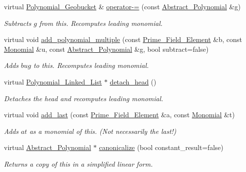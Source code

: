 \begin{Indent}
\begin{DoxyCompactItemize}
\mbox{\label{class_polynomial___geobucket_a7ac0e51256f70a5fba1ea4752d44f0cb}} 
virtual \hyperlink{class_polynomial___geobucket}{Polynomial\+\_\+\+Geobucket} \& \hyperlink{class_polynomial___geobucket_a7ac0e51256f70a5fba1ea4752d44f0cb}{operator-\/=} (const \hyperlink{class_abstract___polynomial}{Abstract\+\_\+\+Polynomial} \&g)
\begin{DoxyCompactList}\small\item\em Subtracts $g$ from {\ttfamily this}. Recomputes leading monomial. \end{DoxyCompactList}\item 
\mbox{\label{class_polynomial___geobucket_a38c043a681aa0c9f1d7deda14513616b}} 
virtual void \hyperlink{class_polynomial___geobucket_a38c043a681aa0c9f1d7deda14513616b}{add\+\_\+polynomial\+\_\+multiple} (const \hyperlink{class_prime___field___element}{Prime\+\_\+\+Field\+\_\+\+Element} \&b, const \hyperlink{class_monomial}{Monomial} \&u, const \hyperlink{class_abstract___polynomial}{Abstract\+\_\+\+Polynomial} \&g, bool subtract=false)
\begin{DoxyCompactList}\small\item\em Adds $bug$ to {\ttfamily this}. Recomputes leading monomial. \end{DoxyCompactList}\item 
\mbox{\label{class_polynomial___geobucket_a57b75287834418f19f4e94250ba7e4cb}} 
virtual \hyperlink{class_polynomial___linked___list}{Polynomial\+\_\+\+Linked\+\_\+\+List} $\ast$ \hyperlink{class_polynomial___geobucket_a57b75287834418f19f4e94250ba7e4cb}{detach\+\_\+head} ()
\begin{DoxyCompactList}\small\item\em Detaches the head and recomputes leading monomial. \end{DoxyCompactList}\item 
virtual void \hyperlink{class_polynomial___geobucket_ac0be908fc725d5b246478b68297fe537}{add\+\_\+last} (const \hyperlink{class_prime___field___element}{Prime\+\_\+\+Field\+\_\+\+Element} \&a, const \hyperlink{class_monomial}{Monomial} \&t)
\begin{DoxyCompactList}\small\item\em Adds $at$ as a monomial of {\ttfamily this}. (Not necessarily the last!) \end{DoxyCompactList}\item 
virtual \hyperlink{class_abstract___polynomial}{Abstract\+\_\+\+Polynomial} $\ast$ \hyperlink{class_polynomial___geobucket_aa76d2c0dce16690b01e8a8c4862b11c5}{canonicalize} (bool constant\+\_\+result=false)
\begin{DoxyCompactList}\small\item\em Returns a copy of {\ttfamily this} in a simplified linear form. \end{DoxyCompactList}\end{DoxyCompactItemize}
\end{Indent}
